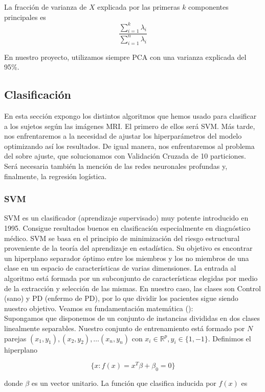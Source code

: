	La fracción de varianza de $X$ explicada por las primeras $k$ componentes principales es
	$$\frac{\sum_{i=1}^{k} \lambda_i}{\sum_{i=1}^{n} \lambda_i}$$
	

En nuestro proyecto, utilizamos siempre PCA con una varianza explicada del 95\%.
\newpage
\subsection{Clasificación}

En esta sección expongo los distintos algoritmos que hemos usado para clasificar a los sujetos según las imágenes MRI. El primero de ellos será SVM. Más tarde, nos enfrentaremos a la necesidad de ajustar los hiperparámetros del modelo optimizando así los resultados. De igual manera, nos enfrentaremos al problema del sobre ajuste, que solucionamos con Validación Cruzada de 10 particiones. Será necesaria también la mención de las redes neuronales profundas y, finalmente, la regresión logística.

\subsubsection{SVM}

SVM es un clasificador (aprendizaje supervisado) muy potente introducido en 1995. Consigue resultados buenos en clasificación especialmente en diagnóstico médico. SVM se basa en el principio de minimización del riesgo estructural proveniente de la teoría del aprendizaje en estadística. Su objetivo es encontrar un hiperplano separador óptimo entre los miembros y los no miembros de una clase en un espacio de características de varias dimensiones. La entrada al algoritmo está formada por un subconjunto de características elegidas por medio de la extracción y selección de las mismas. En nuestro caso, las clases son Control (sano) y PD (enfermo de PD), por lo que dividir los pacientes sigue siendo nuestro objetivo. Veamos su fundamentación matemática (\cite{esl}): \\

Supongamos que disponemos de un conjunto de instancias divididas en dos clases linealmente separables. Nuestro conjunto de entrenamiento está formado por $N$ parejas $(x_1,y_1),(x_2,y_2),\dots (x_n,y_n)$ con $x_i \in \mathbb{R}^p, y_i \in \{1,-1\}$. Definimos el hiperplano

$$\{x:f(x) = x^T \beta + \beta_0 = 0 \}$$

donde $\beta$ es un vector unitario. La función que clasifica inducida por $f(x)$ es 

